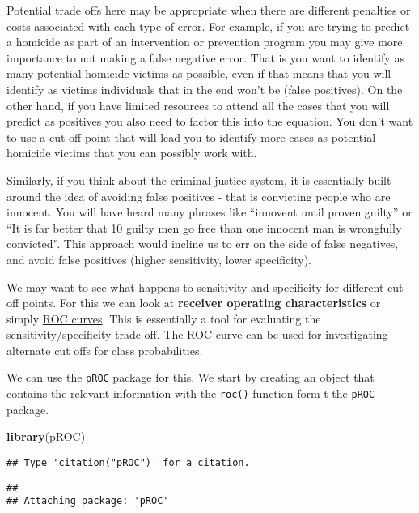 \documentclass[
]{book}
\newenvironment{Shaded}{\begin{snugshade}}{\end{snugshade}}
\newcommand{\FunctionTok}[1]{\textcolor[rgb]{0.13,0.29,0.53}{\textbf{#1}}}
\newcommand{\NormalTok}[1]{#1}
\begin{document}
Potential trade offs here may be appropriate when there are different penalties or costs associated with each type of error. For example, if you are trying to predict a homicide as part of an intervention or prevention program you may give more importance to not making a false negative error. That is you want to identify as many potential homicide victims as possible, even if that means that you will identify as victims individuals that in the end won't be (false positives). On the other hand, if you have limited resources to attend all the cases that you will predict as positives you also need to factor this into the equation. You don't want to use a cut off point that will lead you to identify more cases as potential homicide victims that you can possibly work with.

Similarly, if you think about the criminal justice system, it is essentially built around the idea of avoiding false positives - that is convicting people who are innocent. You will have heard many phrases like ``innovent until proven guilty'' or ``It is far better that 10 guilty men go free than one innocent man is wrongfully convicted''. This approach would incline us to err on the side of false negatives, and avoid false positives (higher sensitivity, lower specificity).

We may want to see what happens to sensitivity and specificity for different cut off points. For this we can look at \textbf{receiver operating characteristics} or simply \href{http://en.wikipedia.org/wiki/Receiver_operating_characteristic}{ROC curves}. This is essentially a tool for evaluating the sensitivity/specificity trade off. The ROC curve can be used for investigating alternate cut offs for class probabilities.

We can use the \texttt{pROC} package for this. We start by creating an object that contains the relevant information with the \texttt{roc()} function form t the \texttt{pROC} package.

\begin{Shaded}
\begin{Highlighting}[]
\FunctionTok{library}\NormalTok{(pROC)}
\end{Highlighting}
\end{Shaded}

\begin{verbatim}
## Type 'citation("pROC")' for a citation.
\end{verbatim}

\begin{verbatim}
## 
## Attaching package: 'pROC'
\end{verbatim}
\end{document}

